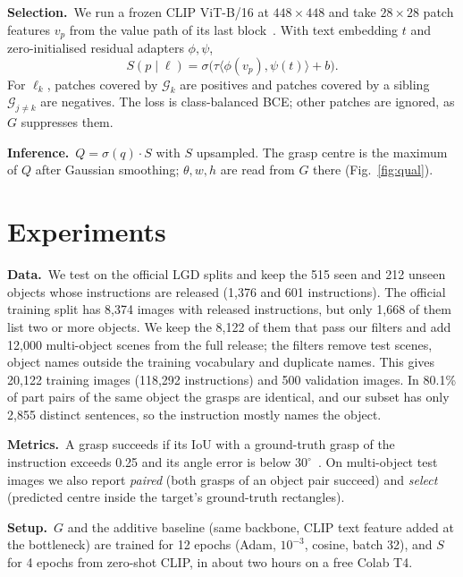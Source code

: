 \documentclass[10pt,twocolumn,letterpaper]{article}
\newcommand{\para}[1]{\par\noindent\textbf{#1}\ }
\begin{document}
\para{Selection.}We run a frozen CLIP ViT-B/16 at $448{\times}448$ and take $28{\times}28$ patch features
$v_p$ from the value path of its last block~\cite{zhou2022maskclip,lan2024clearclip}. With text embedding $t$ and
zero-initialised residual adapters $\phi,\psi$,
\begin{equation}
S(p\mid\ell)=\sigma\big(\tau\langle\phi(v_p),\psi(t)\rangle+b\big).
\end{equation}
For $\ell_k$, patches covered by $\mathcal{G}_k$ are positives and patches covered by a sibling
$\mathcal{G}_{j\ne k}$ are negatives. The loss is class-balanced BCE; other patches
are ignored, as $G$ suppresses them.

\para{Inference.}$Q=\sigma(q)\cdot S$ with $S$ upsampled. The grasp centre is the maximum of $Q$
after Gaussian smoothing; $\theta,w,h$ are read from $G$ there (Fig.~\ref{fig:qual}).

\section{Experiments}
\para{Data.}We test on the official LGD splits and keep the 515 seen and 212 unseen objects
whose instructions are released (1{,}376 and 601 instructions). The official training split has
8{,}374 images with released instructions, but only 1{,}668 of them list two or more objects. We keep
the 8{,}122 of them that pass our filters and add 12{,}000 multi-object scenes from the full release;
the filters remove test scenes, object names outside the training vocabulary and duplicate names. This gives 20{,}122 training images (118{,}292
instructions) and 500 validation images. In 80.1\% of part pairs of the same object the grasps are
identical, and our subset has only 2{,}855 distinct sentences, so the instruction mostly names
the object.

\para{Metrics.}A grasp succeeds if its IoU with a ground-truth grasp of the instruction exceeds 0.25
and its angle error is below $30^\circ$~\cite{vuong2024lgd}. On multi-object test images we also
report \emph{paired} (both grasps of an object pair succeed) and \emph{select} (predicted centre
inside the target's ground-truth rectangles).

\para{Setup.}$G$ and the additive baseline (same backbone, CLIP text feature added at the bottleneck)
are trained for 12 epochs (Adam, $10^{-3}$, cosine, batch 32), and $S$ for 4 epochs from
zero-shot CLIP, in about two hours on a free Colab T4.
\end{document}
